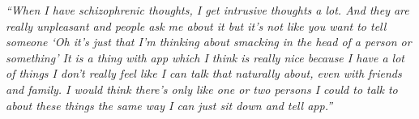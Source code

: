                 \textit{
                ``When I have schizophrenic thoughts, I get intrusive thoughts a lot. And they are really unpleasant and people ask me about it but it's not like you want to tell someone `Oh it's just that I'm thinking about smacking in the head of a person or something'
                It is a thing with \acl{app} which I think is really nice because I have a lot of things I don't really feel like I can talk that naturally about, even with friends and family. I would think there's only like one or two persons I could to talk to about these things the same way I can just sit down and tell \acl{app}.''
                }
            
            

            
            
            
            
            
            
        
